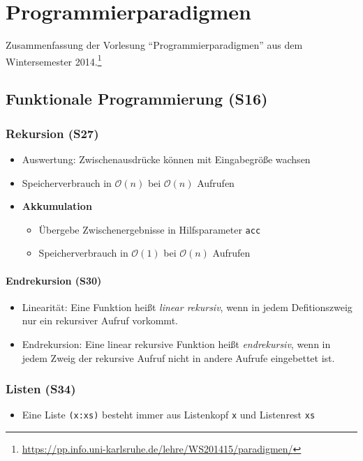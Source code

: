 \chapter{Programmierparadigmen}

Zusammenfassung der Vorlesung "`Programmierparadigmen"' aus dem Wintersemester 2014.\footnote{\url{https://pp.info.uni-karlsruhe.de/lehre/WS201415/paradigmen/}}

\section{Funktionale Programmierung (S16)}

\subsection{Rekursion (S27)}
\begin{itemize}
	\item Auswertung: Zwischenausdrücke können mit Eingabegröße wachsen
	\item Speicherverbrauch in \(\mathcal{O}(n)\) bei \(\mathcal{O}(n)\) Aufrufen
	\item \textbf{Akkumulation}
	\begin{itemize}
		\item Übergebe Zwischenergebnisse in Hilfsparameter \texttt{acc}
		\item Speicherverbrauch in \(\mathcal{O}(1)\) bei \(\mathcal{O}(n)\) Aufrufen
	\end{itemize}
\end{itemize}

\subsubsection{Endrekursion (S30)}
\begin{itemize}
	\item Linearität: Eine Funktion heißt \textit{linear rekursiv}, wenn in jedem Defitionszweig nur ein rekursiver Aufruf vorkommt.
	\item Endrekursion: Eine linear rekursive Funktion heißt \textit{endrekursiv}, wenn in jedem Zweig der rekursive Aufruf nicht in andere Aufrufe eingebettet ist.
\end{itemize}


\subsection{Listen (S34)}
\begin{itemize}
	\item Eine Liste \texttt{(x:xs)} besteht immer aus Listenkopf \texttt{x} und Listenrest \texttt{xs}
\end{itemize}

